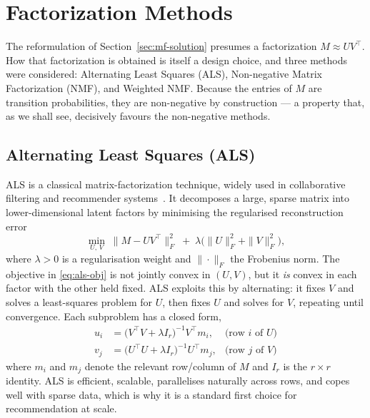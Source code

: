 \section{Factorization Methods}
\label{sec:mf-methods}

The reformulation of Section~\ref{sec:mf-solution} presumes a factorization
$M \approx U V^{\top}$. How that factorization is obtained is itself a design
choice, and three methods were considered: Alternating Least Squares (ALS),
Non-negative Matrix Factorization (NMF), and Weighted NMF. Because the entries
of $M$ are transition probabilities, they are non-negative by construction ---
a property that, as we shall see, decisively favours the non-negative methods.

\subsection{Alternating Least Squares (ALS)}
\label{sec:als}
ALS is a classical matrix-factorization technique, widely used in
collaborative filtering and recommender systems~\cite{HKV08,KBV09}. It
decomposes a large, sparse matrix into lower-dimensional latent factors by
minimising the regularised reconstruction error
\begin{equation}
  \label{eq:als-obj}
  \min_{U,\,V}\;
    \bigl\| M - U V^{\top} \bigr\|_{F}^{2}
    \;+\; \lambda\bigl(\|U\|_{F}^{2} + \|V\|_{F}^{2}\bigr),
\end{equation}
where $\lambda > 0$ is a regularisation weight and $\|\cdot\|_{F}$ the
Frobenius norm. The objective in \eqref{eq:als-obj} is not jointly convex in
$(U,V)$, but it \emph{is} convex in each factor with the other held fixed.
ALS exploits this by alternating: it fixes $V$ and solves a least-squares
problem for $U$, then fixes $U$ and solves for $V$, repeating until
convergence. Each subproblem has a closed form,
\begin{align}
  \label{eq:als-update}
  u_{i} &= \bigl(V^{\top}V + \lambda I_{r}\bigr)^{-1} V^{\top} m_{i},
   &\text{(row $i$ of $U$)} \nonumber\\
  v_{j} &= \bigl(U^{\top}U + \lambda I_{r}\bigr)^{-1} U^{\top} m_{j},
   &\text{(row $j$ of $V$)}
\end{align}
where $m_{i}$ and $m_{j}$ denote the relevant row/column of $M$ and $I_{r}$ is
the $r\times r$ identity. ALS is efficient, scalable, parallelises naturally
across rows, and copes well with sparse data, which is why it is a standard
first choice for recommendation at scale.

